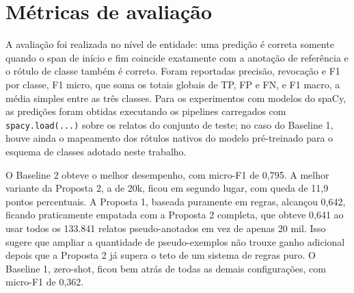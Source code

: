 \documentclass[12pt,a4paper]{article}
\begin{document}
\section{Métricas de avaliação}

A avaliação foi realizada no nível de entidade: uma predição é correta somente
quando o span de início e fim coincide exatamente com a anotação de referência
e o rótulo de classe também é correto. Foram reportadas precisão, revocação e
F1 por classe, F1 micro, que soma os totais globais de TP, FP e FN, e F1
macro, a média simples entre as três classes. Para os experimentos com modelos
do spaCy, as predições foram obtidas executando os pipelines carregados com
\texttt{spacy.load(...)} sobre os relatos do conjunto de teste; no caso do
Baseline 1, houve ainda o mapeamento dos rótulos nativos do modelo pré-treinado
para o esquema de classes adotado neste trabalho.

\begin{table}[H]
\centering
\caption{Avaliação em nível de entidade no conjunto de teste do DDsmall.
Uma predição é correta somente quando span e classe coincidem exatamente.}
\label{tab:entidade}
\small
{}
\end{table}

O Baseline 2 obteve o melhor desempenho, com micro-F1 de 0,795. A melhor
variante da Proposta 2, a de 20k, ficou em segundo lugar, com queda de 11,9
pontos percentuais. A Proposta 1, baseada puramente em regras, alcançou 0,642,
ficando praticamente empatada com a Proposta 2 completa, que obteve 0,641 ao
usar todos os 133.841 relatos pseudo-anotados em vez de apenas 20 mil. Isso
sugere que ampliar a quantidade de pseudo-exemplos não trouxe ganho adicional
depois que a Proposta 2 já supera o teto de um sistema de regras puro. O
Baseline 1, zero-shot, ficou bem atrás de todas as demais configurações, com
micro-F1 de 0,362.
\end{document}

